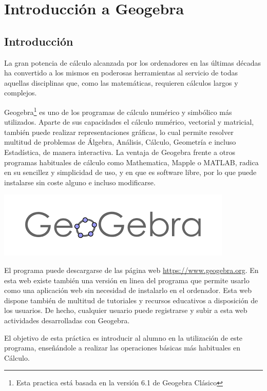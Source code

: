 \chapter{Introducción a Geogebra}

\section{Introducción}
La gran potencia de cálculo alcanzada por los ordenadores en las últimas décadas ha convertido a los mismos en poderosas herramientas al servicio de todas aquellas disciplinas que, como las matemáticas, requieren cálculos largos y complejos.

Geogebra\footnote{Esta practica está basada en la versión 6.1 de Geogebra Clásico} es uno de los programas de cálculo numérico y simbólico más utilizados.
Aparte de sus capacidades el cálculo numérico, vectorial y matricial, también puede realizar representaciones gráficas, lo cual permite resolver multitud de problemas de Álgebra, Análisis, Cálculo, Geometría e incluso Estadística, de manera interactiva.
La ventaja de Geogebra frente a otros programas habituales de cálculo como Mathematica, Mapple o MATLAB, radica en su sencillez y simplicidad de uso, y en que es software libre, por lo que puede instalarse sin coste alguno e incluso modificarse.

\begin{center}
\includegraphics[scale=0.8]{img/introduccion/geogebra-logo}
\end{center}

El programa puede descargarse de las página web \url{https://www.geogebra.org}.
En esta web existe también una versión en linea del programa que permite usarlo como una aplicación web sin necesidad de instalarlo en el ordenador.
Esta web dispone también de multitud de tutoriales y recursos educativos a disposición de los usuarios.
De hecho, cualquier usuario puede registrarse y subir a esta web actividades desarrolladas con Geogebra.

El objetivo de esta práctica es introducir al alumno en la utilización de este programa, enseñándole a realizar las operaciones básicas más habituales en Cálculo.

